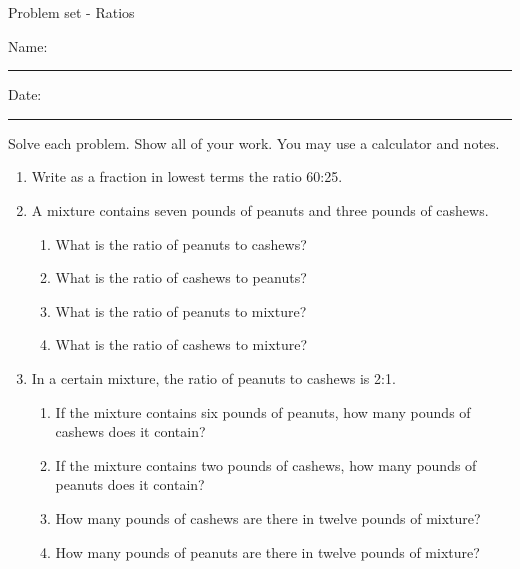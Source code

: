 \documentclass[12pt]{article}
\begin{document}
\pagestyle{empty} %
\begin{center}
          Problem set - Ratios \\[0.5in]
\end{center}
Name: \rule{4in}{0.005in} Date: \rule{1.5in}{0.005in} 
  \vspace{0.25in}

Solve each problem. Show all of your work. You may use a calculator and notes. 

\begin{enumerate}
		\newcommand{\spacing}{\vspace{0.60in}}
\item Write as a fraction in lowest terms the ratio 60:25.
\spacing

\item A mixture contains seven pounds of peanuts and three pounds of cashews. 
    \begin{enumerate}
	\item What is the ratio of peanuts to cashews?
	\vspace{0.125in}
	\item What is the ratio of cashews to peanuts?
	\vspace{0.125in}
	\item What is the ratio of peanuts to mixture?
	\vspace{0.125in}
	\item What is the ratio of cashews to mixture?
	\vspace{0.125in}
    \end{enumerate}
\spacing

\item In a certain mixture, the ratio of peanuts to cashews is 2:1. 
    \begin{enumerate}
	\item If the mixture contains six pounds of peanuts, how many pounds of cashews does it contain?
	\vspace{0.125in}
	\item If the mixture contains two pounds of cashews, how many pounds of peanuts does it contain?
	\vspace{0.125in}
	\item How many pounds of cashews are there in twelve pounds of mixture?
	\vspace{0.125in}
	\item How many pounds of peanuts are there in twelve pounds of mixture?
	\vspace{0.125in}
    \end{enumerate}
\spacing


\end{enumerate}
\end{document}

